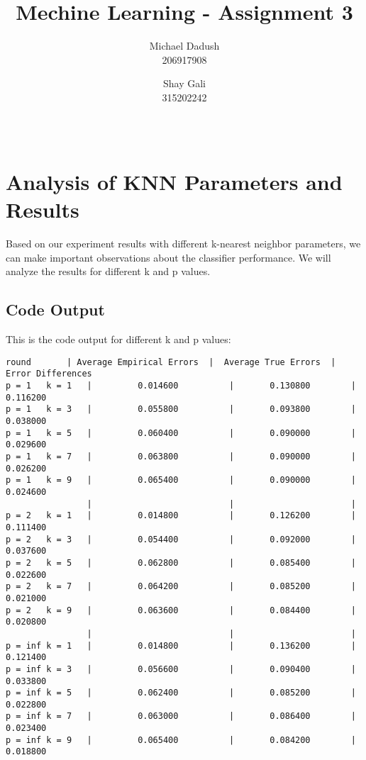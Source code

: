 \documentclass{article}
\title{Mechine Learning - Assignment 3}
\author{Michael Dadush \\ 206917908 \and Shay Gali \\ 315202242}
\date{\monthname[\month] \ \the\year}
\begin{document}
\maketitle

\section{Analysis of KNN Parameters and Results}

Based on our experiment results with different k-nearest neighbor parameters, we can make important observations about the classifier performance. We will analyze the results for different k and p values.


\subsection{Code Output}
This is the code output for different k and p values:
\begin{Verbatim}[fontsize=\small, xleftmargin=0pt, xrightmargin=0pt]
    round       | Average Empirical Errors  |  Average True Errors  |  Error Differences
p = 1   k = 1   |         0.014600          |       0.130800        |      0.116200
p = 1   k = 3   |         0.055800          |       0.093800        |      0.038000
p = 1   k = 5   |         0.060400          |       0.090000        |      0.029600
p = 1   k = 7   |         0.063800          |       0.090000        |      0.026200
p = 1   k = 9   |         0.065400          |       0.090000        |      0.024600
                |                           |                       |
p = 2   k = 1   |         0.014800          |       0.126200        |      0.111400
p = 2   k = 3   |         0.054400          |       0.092000        |      0.037600
p = 2   k = 5   |         0.062800          |       0.085400        |      0.022600
p = 2   k = 7   |         0.064200          |       0.085200        |      0.021000
p = 2   k = 9   |         0.063600          |       0.084400        |      0.020800
                |                           |                       |
p = inf k = 1   |         0.014800          |       0.136200        |      0.121400
p = inf k = 3   |         0.056600          |       0.090400        |      0.033800
p = inf k = 5   |         0.062400          |       0.085200        |      0.022800
p = inf k = 7   |         0.063000          |       0.086400        |      0.023400
p = inf k = 9   |         0.065400          |       0.084200        |      0.018800
\end{Verbatim}
\end{document}
